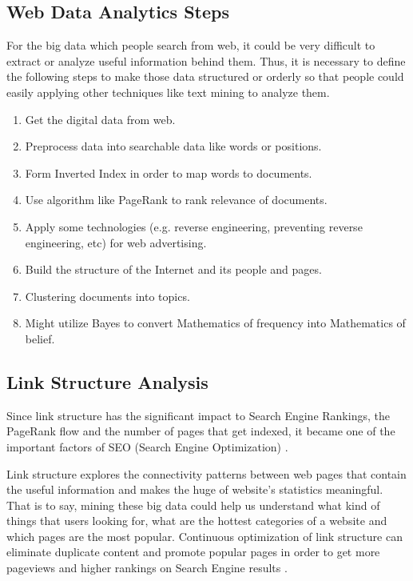 \documentclass[sigconf]{acmart}
\begin{document}
\subsection{Web Data Analytics Steps}
For the big data which people search from web, it could be very difficult to extract or analyze useful information behind them. Thus, it is necessary to define the following steps to make those data structured or orderly so that people could easily applying other techniques like text mining to analyze them.
\begin{enumerate}
\item Get the digital data from web.
\item Preprocess data into searchable data like words or positions.
\item Form Inverted Index in order to map words to documents.
\item Use algorithm like PageRank to rank relevance of documents.
\item Apply some technologies (e.g. reverse engineering, preventing reverse engineering, etc) for web advertising.
\item Build the structure of the Internet and its people and pages.
\item Clustering documents into topics.
\item Might utilize Bayes to convert Mathematics of frequency into Mathematics of belief.
\end{enumerate}

\subsection{Link Structure Analysis}
Since link structure has the significant impact to Search Engine Rankings, the PageRank flow and the number of pages that get indexed, it became one of the important factors of SEO (Search Engine Optimization) \cite{editor08}.

Link structure explores the connectivity patterns between web pages that contain the useful information and makes the huge of website’s statistics meaningful. That is to say, mining these big data could help us understand what kind of things that users looking for, what are the hottest categories of a website and which pages are the most popular. Continuous optimization of link structure can eliminate duplicate content and promote popular pages in order to get more pageviews and higher rankings on Search Engine results \cite{editor08}.
\end{document}
